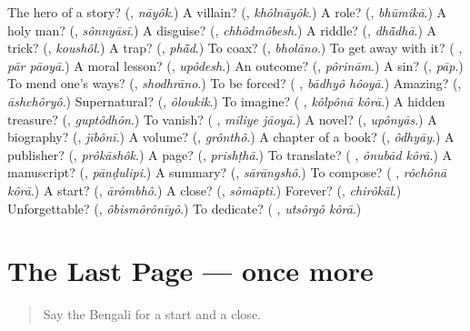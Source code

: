 \begin{tcolorbox}[breakable,colback=teal!4,colframe=teal!35!black,title={Before you move on}]
The hero of a story? (\textbf{}, \emph{nāyôk}.) A villain? (\textbf{}, \emph{khôlnāyôk}.) A role? (\textbf{}, \emph{bhūmikā}.) A holy man? (\textbf{}, \emph{sônnyāsī}.) A disguise? (\textbf{}, \emph{chhôdmôbesh}.) A riddle? (\textbf{}, \emph{dhā̃dhā}.) A trick? (\textbf{}, \emph{koushôl}.) A trap? (\textbf{}, \emph{phā̃d}.) To coax? (\textbf{}, \emph{bholāno}.) To get away with it? (\textbf{ }, \emph{pār pāoyā}.) A moral lesson? (\textbf{}, \emph{upôdesh}.) An outcome? (\textbf{}, \emph{pôrinām}.) A sin? (\textbf{}, \emph{pāp}.) To mend one's ways? (\textbf{}, \emph{shodhrāno}.) To be forced? (\textbf{ }, \emph{bādhyô hôoyā}.) Amazing? (\textbf{}, \emph{āshchôryô}.) Supernatural? (\textbf{}, \emph{ôloukik}.) To imagine? (\textbf{ }, \emph{kôlpônā kôrā}.) A hidden treasure? (\textbf{}, \emph{guptôdhôn}.) To vanish? (\textbf{ }, \emph{miliye jāoyā}.) A novel? (\textbf{}, \emph{upônyās}.) A biography? (\textbf{}, \emph{jībônī}.) A volume? (\textbf{}, \emph{grônthô}.) A chapter of a book? (\textbf{}, \emph{ôdhyāy}.) A publisher? (\textbf{}, \emph{prôkāshôk}.) A page? (\textbf{}, \emph{prishṭhā}.) To translate? (\textbf{ }, \emph{ônubād kôrā}.) A manuscript? (\textbf{}, \emph{pānḍulipi}.) A summary? (\textbf{}, \emph{sārāngshô}.) To compose? (\textbf{ }, \emph{rôchônā kôrā}.) A start? (\textbf{}, \emph{ārômbhô}.) A close? (\textbf{}, \emph{sômāpti}.) Forever? (\textbf{}, \emph{chirôkāl}.) Unforgettable? (\textbf{}, \emph{ôbismôrônīyô}.) To dedicate? (\textbf{ }, \emph{utsôrgô kôrā}.)
\end{tcolorbox}
\section[(dialogue)]{The Last Page — once more}

\label{lesson:BN-R329-review-final-329}



\begin{quote}
Say the Bengali for a start and a close.
\end{quote}


